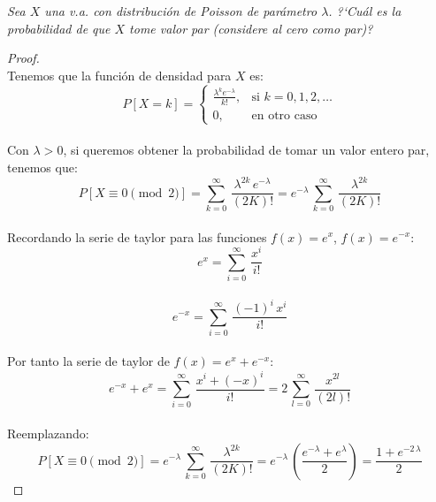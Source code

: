 \documentclass[11pt,letterpaper]{article}
\begin{document}
\begin{tcolorbox}[ 
	title = \textcolor{black}{\textcolor{white}{Problema 7}},]
\textit{Sea $X$ una v.a. con distribuci\'on de Poisson de par\'ametro $\lambda$. ?`Cu\'al es la probabilidad de que $X$ tome valor par (considere al cero como par)?
}
\end{tcolorbox}
\begin{proof}\,\\
  Tenemos que la funci\'on de densidad para $X$ es:\,\\
\begin{equation*}
P[X = k] =
\begin{cases}
\displaystyle \frac{\lambda^k e^{-\lambda}}{k!}, & \text{si } k = 0, 1, 2, \dots \\
0, & \text{en otro caso}
\end{cases}
\end{equation*}\,\\
Con $\lambda>0$, si queremos obtener la probabilidad de tomar un valor entero par, tenemos que:\,\\
\begin{equation*}
  P[X \equiv 0 \pmod{2}]=\sum_{k=0}^{\infty}\,\frac{\lambda^{2k}\,e^{-\lambda}}{(2K)!}=e^{-\lambda}\,\sum_{k=0}^{\infty}\,\frac{\lambda^{2k}}{(2K)!}
\end{equation*}\,\\
Recordando la serie de taylor para las funciones $f(x)=e^x$, $f(x)=e^{-x}$:\,\\
\begin{equation*}
  e^{x}=\sum_{i=0}^{\infty}\,\frac{x^i}{i!}
\end{equation*}\,\\
\begin{equation*}
  e^{-x}=\sum_{i=0}^{\infty}\,\frac{(-1)^i\,x^i}{i!}
\end{equation*}\,\\
Por tanto la serie de taylor de $f(x)=e^x+e^{-x}$:\,\\
\begin{equation*}
  e^{-x}+e^x=\sum_{i=0}^{\infty}\,\frac{x^i+(-x)^i}{i!}=2\,\sum_{l=0}^{\infty}\,\frac{x^{2l}}{(2l)!}
\end{equation*}\,\\
Reemplazando:\,\\
\begin{equation*}
  P[X \equiv 0 \pmod{2}]=e^{-\lambda}\,\sum_{k=0}^{\infty}\,\frac{\lambda^{2k}}{(2K)!}=e^{-\lambda}\,\left(\frac{e^{-\lambda}+e^{\lambda}}{2}\right)=\frac{1+e^{-2\,\lambda}}{2}
\end{equation*}
\end{proof}\,\\
\end{document}
